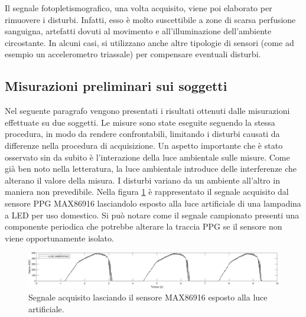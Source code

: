Il segnale fotopletismografico, una volta acquisito, viene poi elaborato per rimuovere i disturbi. Infatti, esso è molto suscettibile a zone di scarsa perfusione sanguigna, artefatti dovuti al movimento e all'illuminazione dell'ambiente circostante. In alcuni casi, si utilizzano anche altre tipologie di sensori (come ad esempio un accelerometro triassale) per compensare eventuali disturbi.

\subsection{Misurazioni preliminari sui soggetti}\label{cap:misure_preliminari}
Nel seguente paragrafo vengono presentati i risultati ottenuti dalle misurazioni effettuate su due soggetti.
Le misure sono state eseguite seguendo la stessa procedura, in modo da rendere confrontabili, limitando i disturbi causati da differenze nella procedura di acquisizione. Un aspetto importante che è stato osservato sin da subito è l'interazione della luce ambientale sulle misure. Come già ben noto nella letteratura, la luce ambientale introduce delle interferenze che alterano il valore della misura. I disturbi variano da un ambiente all'altro in maniera non prevedibile. Nella figura \ref{fig:ambiente_MAX86916} è rappresentato il segnale acquisito dal sensore PPG MAX86916 lasciandolo esposto alla luce artificiale di una lampadina a LED per uso domestico. Si può notare come il segnale campionato presenti una componente periodica che potrebbe alterare la traccia PPG se il sensore non viene opportunamente isolato.

\begin{figure}[t]
	\centering
	\includegraphics[width=1\linewidth]{ImageFiles/Misure Preliminari/ambiente}
	\caption{Segnale acquisito lasciando il sensore MAX86916 esposto alla luce artificiale.}
	\label{fig:ambiente_MAX86916}
\end{figure}

